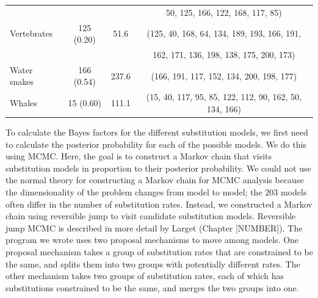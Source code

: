 \documentclass{svmult}
\begin{document}
\begin{table}[b]
\begin{tabular}{l c c c}
                             &            &       & 50, 125, 166, 122, 168, 117, 85) \\
Vertebrates               & 125 (0.20) &  51.6 & (125, 40, 168, 64, 134, 189, 193, 166, 191, \\
                             &            &       & 162, 171, 136, 198, 138, 175, 200, 173) \\ 
Water snakes               & 166 (0.54) & 237.6 & (166, 191, 117, 152, 134, 200, 198, 177) \\ 
Whales                    &  15 (0.60) & 111.1 & (15, 40, 117, 95, 85, 122, 112, 90, 162, 50, 134, 166) \\
\hline
\end{tabular}
\label{tab3}
\end{table}

To calculate the Bayes factors for the different substitution models, we first need to calculate the posterior probability for each of the possible models. We do this using MCMC.
Here, the goal is to construct a Markov chain that visits substitution models in proportion to their posterior probability. We could not use the normal theory for
constructing a Markov chain for MCMC analysis because the dimensionality of the problem changes from model to model; the 203 models often differ in the number
of substitution rates. Instead, we constructed a Markov chain using reversible jump to visit candidate substitution models. Reversible jump MCMC is described in 
more detail by Larget (Chapter [NUMBER]). The program we wrote uses two proposal mechanisms to move among models. One proposal mechanism takes a group
of substitution rates that are constrained to be the same, and splits them into two groups with potentially different rates. The other mechanism takes two groups of
substitution rates, each of which has substitutions constrained to be the same, and merges the two groups into one. 
\end{document}
